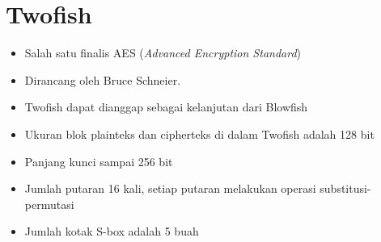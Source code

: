 \documentclass{article}
\begin{document}

\section*{Twofish}

\begin{itemize}
    \item Salah satu finalis AES (\textit{Advanced Encryption Standard})
    \item Dirancang oleh Bruce Schneier.
    \item Twofish dapat dianggap sebagai kelanjutan dari Blowfish
    \item Ukuran blok plainteks dan cipherteks di dalam Twofish adalah 128 bit
    \item Panjang kunci sampai 256 bit
    \item Jumlah putaran 16 kali, setiap putaran melakukan operasi substitusi-permutasi
    \item Jumlah kotak S-box adalah 5 buah
\end{itemize}
\end{document}
